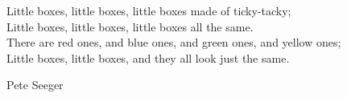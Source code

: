 \epigraph{Little boxes, little boxes, little boxes made of ticky-tacky;\\
Little boxes, little boxes, little boxes all the same.\\
There are red ones, and blue ones, and green ones, and yellow ones;\\
Little boxes, little boxes, and they all look just the same.}{Pete Seeger}
